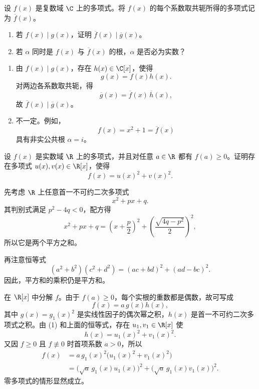 \begin{problem}
 \label{p1:concept:c1-l2305}设 \(f(x)\) 是复数域 \(\C\) 上的多项式。将 \(f(x)\) 的每个系数取共轭所得的多项式记为 \(\overline{f}(x)\)。
	\begin{enumerate}
		\item 若 \(f(x)\mid g(x)\)，证明 \(\overline{f}(x)\mid\overline{g}(x)\)。
		\item 若 \(\alpha\) 同时是 \(f(x)\) 与 \(\overline{f}(x)\) 的根，\(\alpha\) 是否必为实数？
	\end{enumerate}
\end{problem}

\begin{solution}
	\begin{enumerate}
		\item 由 \(f(x)\mid g(x)\)，存在 \(h(x)\in\C[x]\)，使得
		\[
		g(x)=f(x)h(x).
		\]
		对两边各系数取共轭，得
		\[
		\overline{g}(x)=\overline{f}(x)\,\overline{h}(x),
		\]
		故 \(\overline{f}(x)\mid\overline{g}(x)\)。
		
		\item 不一定。例如，
		\[
		f(x)=x^2+1=\overline{f}(x)
		\]
		具有非实公共根 \(\alpha=i\)。
	\end{enumerate}
\end{solution}

\begin{problem}
	 设 \(f(x)\) 是实数域 \(\R\) 上的多项式，并且对任意 \(a\in\R\) 都有 \(f(a)\ge0\)。证明存在多项式 \(u(x),v(x)\in\R[x]\)，使得
	\[
	f(x)=u(x)^2+v(x)^2.
	\]
\end{problem}

\begin{solution}
	先考虑 \(\R\) 上任意首一不可约二次多项式
	\[
	x^2+px+q.
	\]
	其判别式满足 \(p^2-4q<0\)，配方得
	\begin{equation}
		x^2+px+q
		=\left(x+\frac p2\right)^2
		+\left(\frac{\sqrt{4q-p^2}}2\right)^2,
		\tag{1}
	\end{equation}
	所以它是两个平方之和。
	
	再注意恒等式
	\[
	(a^2+b^2)(c^2+d^2)=(ac+bd)^2+(ad-bc)^2.
	\]
	因此，平方和的乘积仍是平方和。
	
	在 \(\R[x]\) 中分解 \(f\)。由于 \(f(a)\ge0\)，每个实根的重数都是偶数，故可写成
	\[
	f(x)=a\,g(x)h(x),
	\]
	其中 \(g(x)=g_1(x)^2\) 是实线性因子的偶次幂之积，\(h(x)\) 是首一不可约二次多项式之积。由 (1) 和上面的恒等式，存在 \(u_1,v_1\in\R[x]\) 使
	\[
	h(x)=u_1(x)^2+v_1(x)^2.
	\]
	又因 \(f\ge0\) 且 \(f\not\equiv0\) 时首项系数 \(a>0\)，所以
	\[
	\begin{aligned}
		f(x)
		&=a\,g_1(x)^2\bigl(u_1(x)^2+v_1(x)^2\bigr)\\
		&=\bigl(\sqrt a\,g_1(x)u_1(x)\bigr)^2
		+\bigl(\sqrt a\,g_1(x)v_1(x)\bigr)^2.
	\end{aligned}
	\]
	零多项式的情形显然成立。
\end{solution}

